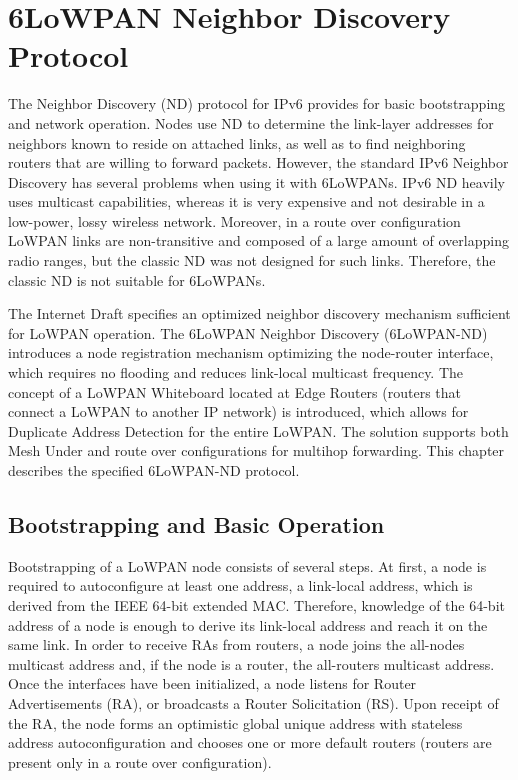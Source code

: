 \chapter{6LoWPAN Neighbor Discovery Protocol}\label{ch:nd}
The Neighbor Discovery (ND) protocol for IPv6 \cite{rfc4861} provides for basic bootstrapping and network operation. Nodes use ND to determine the link-layer addresses for neighbors known to reside on attached links, as well as to find neighboring routers that are willing to forward packets. However, the standard IPv6 Neighbor Discovery has several problems when using it with 6LoWPANs. IPv6 ND heavily uses multicast capabilities, whereas it is very expensive and not desirable in a low-power, lossy wireless network. Moreover, in a route over configuration LoWPAN links are non-transitive and composed of a large amount of overlapping radio ranges, but the classic ND was not designed for such links. Therefore, the classic ND is not suitable for 6LoWPANs. 

The Internet Draft \cite{draft-nd-07} specifies an optimized neighbor discovery mechanism sufficient for LoWPAN operation. The 6LoWPAN Neighbor Discovery (6LoWPAN-ND) introduces a node registration mechanism optimizing the node-router interface, which requires no flooding and reduces link-local multicast frequency.  The concept of a LoWPAN Whiteboard located at Edge Routers (routers that connect a LoWPAN to another IP network) is introduced, which allows for Duplicate Address Detection for the entire LoWPAN. The solution supports both Mesh Under and route over configurations for multihop forwarding. This chapter describes the specified 6LoWPAN-ND protocol.


\section{Bootstrapping and Basic Operation}
Bootstrapping of a LoWPAN node consists of several steps.  At first, a node is required to autoconfigure at least one address, a link-local address, which is derived from the IEEE 64-bit extended MAC.  Therefore,  knowledge of the 64-bit address of a node is enough to derive its link-local address and reach it on the same link. In order to receive RAs from routers, a node joins the all-nodes multicast address and, if the node is a router, the all-routers multicast address. Once the interfaces have been initialized, a node listens for Router Advertisements (RA), or broadcasts a Router Solicitation (RS). Upon receipt of the RA, the node forms an optimistic global unique address with stateless address autoconfiguration and chooses one or more default routers (routers are present only in a route over configuration). 

